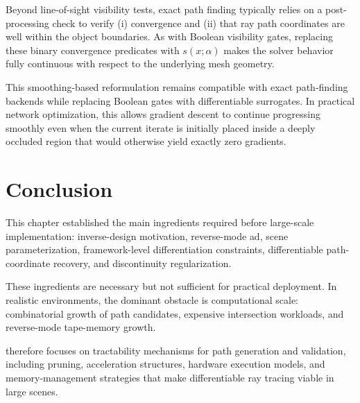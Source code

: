 Beyond \gls{line-of-sight} visibility tests, exact path finding typically relies on a post-processing check to verify (i) convergence and (ii) that ray path coordinates are well within the object boundaries. As with Boolean visibility gates, replacing these binary convergence predicates with $s(x;\alpha)$ makes the solver behavior fully continuous with respect to the underlying mesh geometry.

This smoothing-based reformulation remains compatible with exact path-finding backends while replacing Boolean gates with differentiable surrogates. In practical network optimization, this allows gradient descent to continue progressing smoothly even when the current iterate is initially placed inside a deeply occluded region that would otherwise yield exactly zero gradients.

\section{Conclusion}

This chapter established the main ingredients required before large-scale implementation: inverse-design motivation, reverse-mode \gls{ad}, scene parameterization, framework-level differentiation constraints, differentiable path-coordinate recovery, and discontinuity regularization.

These ingredients are necessary but not sufficient for practical deployment. In realistic environments, the dominant obstacle is computational scale: combinatorial growth of path candidates, expensive intersection workloads, and reverse-mode tape-memory growth.

 therefore focuses on tractability mechanisms for path generation and validation, including pruning, acceleration structures, hardware execution models, and memory-management strategies that make differentiable ray tracing viable in large scenes.

